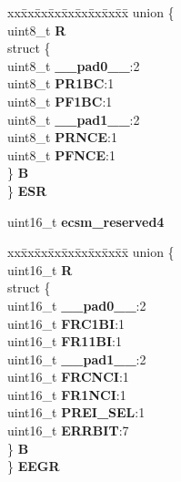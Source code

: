 \begin{DoxyCompactItemize}
\begin{tabbing}
\end{tabbing}\item 
\mbox{\label{structECSM__tag_a9b53da8b61187b4235af1d5bf9bf66a9}} 
\begin{tabbing}
xx\=xx\=xx\=xx\=xx\=xx\=xx\=xx\=xx\=\kill
union \{\\
\>uint8\_t {\bfseries R}\\
\>struct \{\\
\>\>uint8\_t {\bfseries \_\_pad0\_\_}:2\\
\>\>uint8\_t {\bfseries PR1BC}:1\\
\>\>uint8\_t {\bfseries PF1BC}:1\\
\>\>uint8\_t {\bfseries \_\_pad1\_\_}:2\\
\>\>uint8\_t {\bfseries PRNCE}:1\\
\>\>uint8\_t {\bfseries PFNCE}:1\\
\>\} {\bfseries B}\\
\} {\bfseries ESR}\\

\end{tabbing}\item 
\mbox{\label{structECSM__tag_a97c54c65ea676c9ea3bffe5eb059a121}} 
uint16\+\_\+t {\bfseries ecsm\+\_\+reserved4}
\item 
\mbox{\label{structECSM__tag_aa7e6849683f898d27de1befb51023ac0}} 
\begin{tabbing}
xx\=xx\=xx\=xx\=xx\=xx\=xx\=xx\=xx\=\kill
union \{\\
\>uint16\_t {\bfseries R}\\
\>struct \{\\
\>\>uint16\_t {\bfseries \_\_pad0\_\_}:2\\
\>\>uint16\_t {\bfseries FRC1BI}:1\\
\>\>uint16\_t {\bfseries FR11BI}:1\\
\>\>uint16\_t {\bfseries \_\_pad1\_\_}:2\\
\>\>uint16\_t {\bfseries FRCNCI}:1\\
\>\>uint16\_t {\bfseries FR1NCI}:1\\
\>\>uint16\_t {\bfseries PREI\_SEL}:1\\
\>\>uint16\_t {\bfseries ERRBIT}:7\\
\>\} {\bfseries B}\\
\} {\bfseries EEGR}\\


\end{tabbing}
\end{DoxyCompactItemize}
